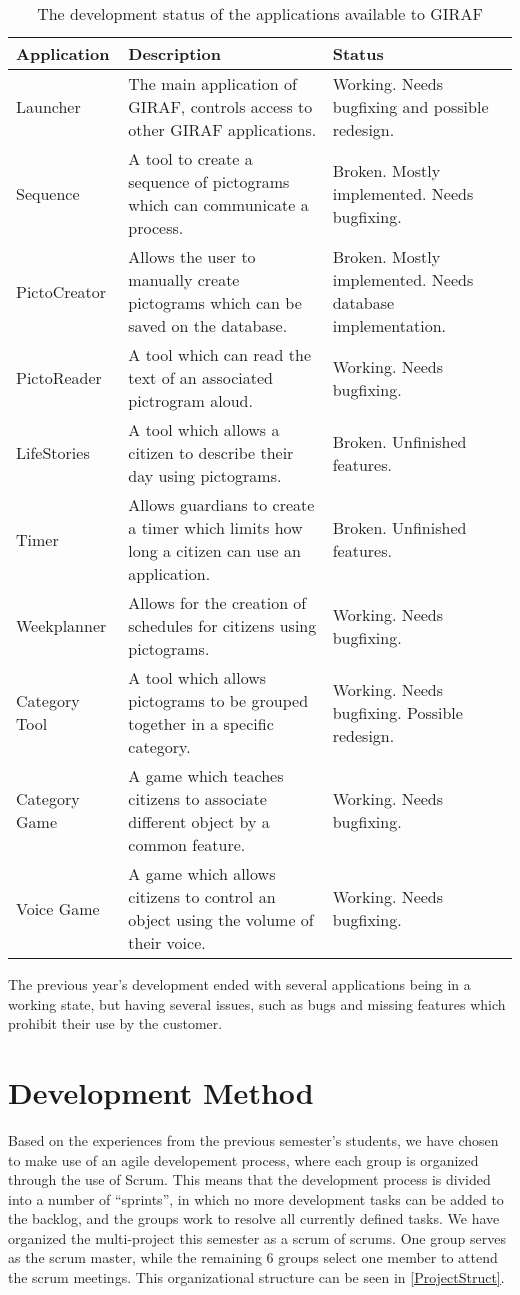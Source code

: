 \begin{table}[H]
\centering
\begin{tabular}{|p{2.7cm}|p{6cm}|p{5cm}|}
\hline
Application			& Description & Status \\\hline
Launcher  			& The main application of GIRAF, controls access to other GIRAF
applications. & Working. Needs bugfixing and possible redesign. \\\hline
Sequence & A tool to create a sequence of pictograms which can communicate a
process. & Broken. Mostly implemented. Needs bugfixing.\\\hline 
PictoCreator  	   	& Allows the user to
manually create pictograms which can be saved on the database. & Broken. Mostly
implemented. Needs database implementation.\\\hline 
PictoReader	   		& A tool
which can read the text of an associated pictrogram aloud. & Working.
Needs bugfixing.\\\hline 
LifeStories	   		& A tool which allows a citizen to
describe their day using pictograms. & Broken. Unfinished features. \\\hline 
Timer     	   		& Allows guardians to create a timer which
limits how long a citizen can use an application. & Broken. Unfinished
features.\\\hline 
Weekplanner 		& Allows for the creation of schedules for citizens
using pictograms. & Working. Needs bugfixing.\\\hline 
Category Tool		& A tool which allows pictograms to be grouped together
in a specific category. & Working. Needs bugfixing. Possible redesign.\\\hline 
Category Game   	& A game which teaches citizens to associate
different object by a common feature. & Working. Needs bugfixing.\\\hline 
Voice Game  		& A game which allows citizens to control an object
using the volume of their voice. & Working. Needs bugfixing.\\\hline
\end{tabular} 
\caption{The development status of the applications available to GIRAF}
\label{GApps}
\end{table}

The previous year's development ended with several applications being in a
working state, but having several issues, such as bugs and missing features
which prohibit their use by the customer.

\section{Development Method}
Based on the experiences from the previous semester's students, we have chosen
to make use of an agile developement process, where each group is organized through
the use of Scrum. This means that the development process is divided into a
number of ``sprints'', in which no more development tasks can be added to the
backlog, and the groups work to resolve all currently defined tasks. We have
organized the multi-project this semester as a scrum of scrums. One group serves
as the scrum master, while the remaining 6 groups select one member to
attend the scrum meetings. This organizational structure can be seen in
\autoref{ProjectStruct}.

